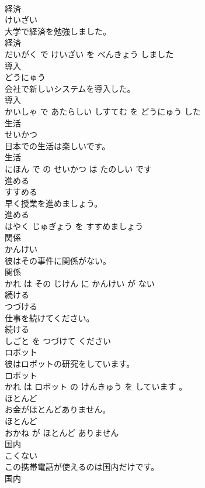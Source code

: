 \documentclass[8pt]{extreport}
\begin{document}
\begin{CJK}{UTF8}{min}
\\	経済	
\\	けいざい			
\\	大学で経済を勉強しました。	
\\	経済 
\\	だいがく で けいざい を べんきょう しました			
\\	導入	
\\	どうにゅう			
\\	会社で新しいシステムを導入した。	
\\	導入 
\\	かいしゃ で あたらしい しすてむ を どうにゅう した			
\\	生活	
\\	せいかつ			
\\	日本での生活は楽しいです。	
\\	生活 
\\	にほん で の せいかつ は たのしい です			
\\	進める	
\\	すすめる			
\\	早く授業を進めましょう。	
\\	進める 
\\	はやく じゅぎょう を すすめましょう			
\\	関係	
\\	かんけい			
\\	彼はその事件に関係がない。	
\\	関係 
\\	かれ は その じけん に かんけい が ない			
\\	続ける	
\\	つづける			
\\	仕事を続けてください。	
\\	続ける 
\\	しごと を つづけて ください			
\\	ロボット	
\\	彼はロボットの研究をしています。	
\\	ロボット 
\\	かれ は ロボット の けんきゅう を しています 。			
\\	ほとんど	
\\	お金がほとんどありません。	
\\	ほとんど 
\\	おかね が ほとんど ありません			
\\	国内	
\\	こくない			
\\	この携帯電話が使えるのは国内だけです。	
\\	国内 

\end{CJK}
\end{document}
